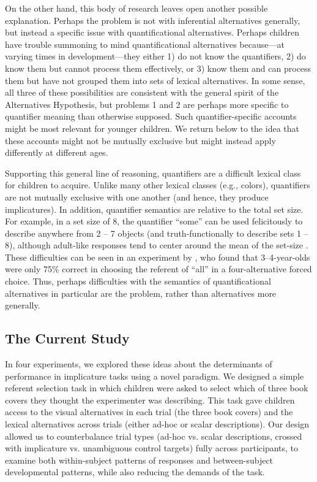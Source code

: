 \documentclass[man]{apa2}
\begin{document}
On the other hand, this body of research leaves open another possible explanation. Perhaps the problem is not with inferential alternatives generally, but instead a specific issue with quantificational alternatives. Perhaps children have trouble summoning to mind quantificational alternatives because---at varying times in development---they either 1) do not know the quantifiers, 2) do know them but cannot process them effectively, or 3) know them and can process them but have not grouped them into sets of lexical alternatives. In some sense, all three of these possibilities are consistent with the general spirit of the Alternatives Hypothesis, but problems 1 and 2 are perhaps more specific to quantifier meaning than otherwise supposed. Such quantifier-specific accounts might be most relevant for younger children. We return below to the idea that these accounts might not be mutually exclusive but might instead apply differently at different ages.

Supporting this general line of reasoning, quantifiers are a difficult lexical class for children to acquire. Unlike many other lexical classes (e.g., colors), quantifiers are not mutually exclusive with one another (and hence, they produce implicatures). In addition, quantifier semantics are relative to the total set size. For example, in a set size of 8, the quantifier ``some'' can be used felicitously to describe anywhere from 2 -- 7 objects \cite{barner2009} (and truth-functionally to describe sets 1 -- 8), although adult-like responses tend to center around the mean of the set-size \cite{franke2014}. These difficulties can be seen in an experiment by , who found that 3--4-year-olds were only 75\% correct in choosing the referent of ``all'' in a four-alternative forced choice. Thus, perhaps difficulties with the semantics of quantificational alternatives in particular are the problem, rather than alternatives more generally.

\subsection{The Current Study}

In four experiments, we explored these ideas about the determinants of performance in implicature tasks using a novel paradigm. We designed a simple referent selection task in which children were asked to select which of three book covers they thought the experimenter was describing. This task gave children access to the visual alternatives in each trial (the three book covers) and the lexical alternatives across trials (either ad-hoc or scalar descriptions). Our design allowed us to counterbalance trial types (ad-hoc vs. scalar descriptions, crossed with implicature vs. unambiguous control targets) fully across participants, to examine both within-subject patterns of responses and between-subject developmental patterns, while also reducing the demands of the task.
\end{document}
